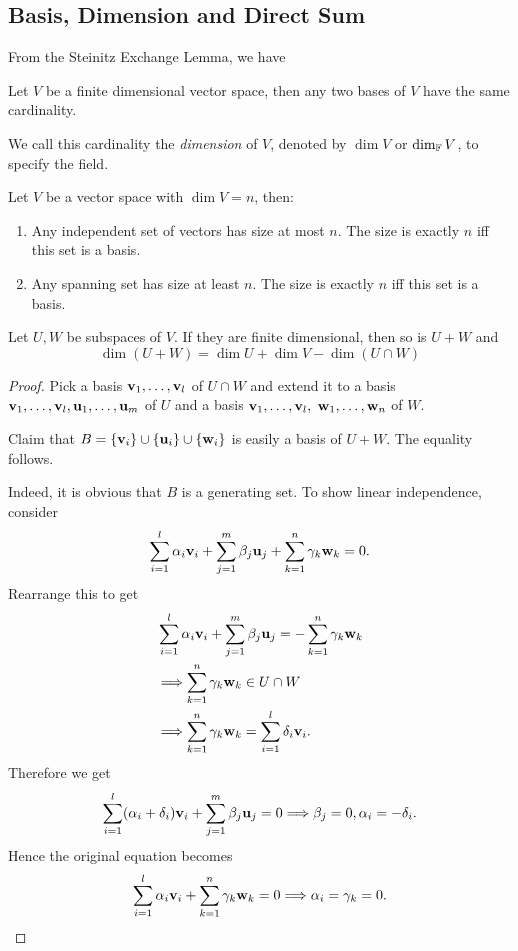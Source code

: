 \documentclass[a4paper]{article}
\begin{document}
\subsection{Basis, Dimension and Direct Sum}
From the Steinitz Exchange Lemma, we have
\begin{corollary}\label{dim_well_defined}
    Let $V$ be a finite dimensional vector space, then any two bases of $V$ have the same cardinality.
\end{corollary}
We call this cardinality the \textit{dimension} of $V$, denoted by $ \dim V $ or $ \dim_{\mathbb{F}} V $, to specify the field.
\begin{corollary}
    Let $V$ be a vector space with $\dim V=n$, then:
    \begin{enumerate}
        \item Any independent set of vectors has size at most $n$.
        The size is exactly $n$ iff this set is a basis.
        \item Any spanning set has size at least $n$.
        The size is exactly $n$ iff this set is a basis.
    \end{enumerate}
\end{corollary}
\begin{proposition}
    Let $U,W$ be subspaces of $V$.
    If they are finite dimensional, then so is $U+W$ and
    $$\dim(U+W)=\dim U+\dim V-\dim(U\cap W)$$
\end{proposition}
\begin{proof}
    Pick a basis ${\bf v}_1,\ldots,{\bf v}_l$ of $U\cap W$ and extend it to a basis ${\bf v}_1,\ldots,{\bf v}_l,{\bf u}_1,\ldots,{\bf u}_m$ of $U$ and a basis ${\bf v}_1,\ldots,{\bf v}_l,$ ${\bf w}_1,\ldots,{\bf w}_n$ of $W$. 
    
    Claim that $B=\{{\bf v}_i\}\cup\{{\bf u}_i\}\cup\{{\bf w}_i\}$ is easily a basis of $U+W$.
    The equality follows.

    Indeed, it is obvious that $B$ is a generating set. To show linear independence, consider 
    \[
        \sum_{i=1}^{l}\alpha_i {\bf v}_i+\sum_{j=1}^{m}\beta_j {\bf u}_j+\sum_{k=1}^{n}\gamma_k{\bf w}_k=0.
    \]
    Rearrange this to get 
    \[
        \begin{aligned}
           & \sum_{i=1}^{l}\alpha_i {\bf v}_i+\sum_{j=1}^{m}\beta_j {\bf u}_j=-\sum_{k=1}^{n}\gamma_k{\bf w}_k\\ &\Longrightarrow \sum_{k=1}^{n}\gamma_k{\bf w}_k\in U \cap W\\ &\Longrightarrow \sum_{k=1}^{n}\gamma_k{\bf w}_k=\sum_{i=1}^{l}\delta_i{\bf v}_i.
        \end{aligned}
    \]
    Therefore we get 
    \[
        \sum_{i=1}^{l}(\alpha_i+\delta_i){\bf v}_i+\sum_{j=1}^{m}\beta_j {\bf u}_j=0 \Longrightarrow \beta_j=0,\alpha_i=-\delta_i.
    \]
    Hence the original equation becomes 
    \[
        \sum_{i=1}^{l}\alpha_i{\bf v}_i+\sum_{k=1}^{n}\gamma_k{\bf w}_k=0 \Longrightarrow \alpha_i=\gamma_k=0.\qedhere
    \]
\end{proof}
\end{document}
